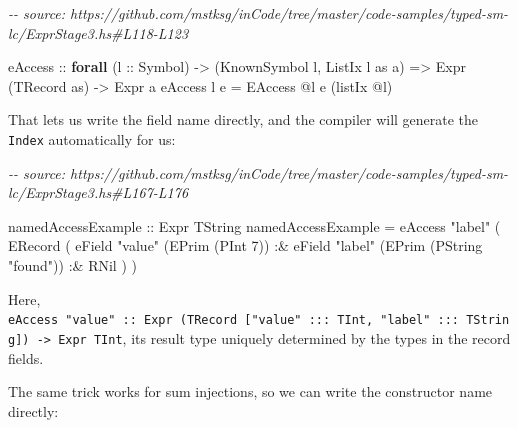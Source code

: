 \documentclass[]{article}
\newenvironment{Shaded}{}{}
\newcommand{\CommentTok}[1]{\textcolor[rgb]{0.38,0.63,0.69}{\textit{#1}}}
\newcommand{\DataTypeTok}[1]{\textcolor[rgb]{0.56,0.13,0.00}{#1}}
\newcommand{\DecValTok}[1]{\textcolor[rgb]{0.25,0.63,0.44}{#1}}
\newcommand{\KeywordTok}[1]{\textcolor[rgb]{0.00,0.44,0.13}{\textbf{#1}}}
\newcommand{\NormalTok}[1]{#1}
\newcommand{\OperatorTok}[1]{\textcolor[rgb]{0.40,0.40,0.40}{#1}}
\newcommand{\OtherTok}[1]{\textcolor[rgb]{0.00,0.44,0.13}{#1}}
\newcommand{\StringTok}[1]{\textcolor[rgb]{0.25,0.44,0.63}{#1}}
\begin{document}
\begin{Shaded}
\begin{Highlighting}[]
\CommentTok{{-}{-} source: https://github.com/mstksg/inCode/tree/master/code{-}samples/typed{-}sm{-}lc/ExprStage3.hs\#L118{-}L123}

\OtherTok{eAccess ::}
  \KeywordTok{forall}\NormalTok{ (}\OtherTok{l ::} \DataTypeTok{Symbol}\NormalTok{) }\OtherTok{{-}\textgreater{}}
\NormalTok{  (}\DataTypeTok{KnownSymbol}\NormalTok{ l, }\DataTypeTok{ListIx}\NormalTok{ l as a) }\OtherTok{=\textgreater{}}
  \DataTypeTok{Expr}\NormalTok{ (}\DataTypeTok{TRecord}\NormalTok{ as) }\OtherTok{{-}\textgreater{}}
  \DataTypeTok{Expr}\NormalTok{ a}
\NormalTok{eAccess l e }\OtherTok{=} \DataTypeTok{EAccess} \OperatorTok{@}\NormalTok{l e (listIx }\OperatorTok{@}\NormalTok{l)}
\end{Highlighting}
\end{Shaded}

That lets us write the field name directly, and the compiler will generate the
\texttt{Index} automatically for us:

\begin{Shaded}
\begin{Highlighting}[]
\CommentTok{{-}{-} source: https://github.com/mstksg/inCode/tree/master/code{-}samples/typed{-}sm{-}lc/ExprStage3.hs\#L167{-}L176}

\OtherTok{namedAccessExample ::} \DataTypeTok{Expr} \DataTypeTok{TString}
\NormalTok{namedAccessExample }\OtherTok{=}
\NormalTok{  eAccess}
    \StringTok{"label"}
\NormalTok{    ( }\DataTypeTok{ERecord}
\NormalTok{        ( eField }\StringTok{"value"}\NormalTok{ (}\DataTypeTok{EPrim}\NormalTok{ (}\DataTypeTok{PInt} \DecValTok{7}\NormalTok{))}
            \OperatorTok{:\&}\NormalTok{ eField }\StringTok{"label"}\NormalTok{ (}\DataTypeTok{EPrim}\NormalTok{ (}\DataTypeTok{PString} \StringTok{"found"}\NormalTok{))}
            \OperatorTok{:\&} \DataTypeTok{RNil}
\NormalTok{        )}
\NormalTok{    )}
\end{Highlighting}
\end{Shaded}

Here,
\texttt{eAccess\ "value"\ ::\ Expr\ (TRecord\ {[}"value"\ :::\ TInt,\ "label"\ :::\ TString{]})\ -\textgreater{}\ Expr\ TInt},
its result type uniquely determined by the types in the record fields.

The same trick works for sum injections, so we can write the constructor name
directly:
\end{document}
